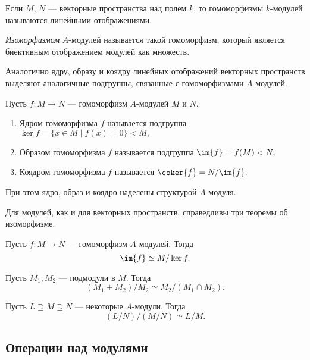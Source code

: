     Если $M$, $N$ --- векторные пространства над полем $k$, то гомоморфизмы $k$-модулей  называются линейными отображениями.

    \begin{Def}
        \textit{Изоморфизмом} $A$-модулей называется такой гомоморфизм, который является биективным отображением модулей как множеств.
    \end{Def}

    Аналогично ядру, образу и коядру линейных отображений векторных пространств выделяют аналогичные подгруппы, связанные с гомоморфизмами $A$-модулей.

    \begin{Def}
        Пусть $f : M \rightarrow N$ --- гомоморфизм $A$-модулей $M$ и $N$. 

        \begin{enumerate}
            \item Ядром гомоморфизма $f$ называется подгруппа $\ker{f} = \{x \in M \mid f(x) = 0\} < M,$
            \item Образом гомоморфизма $f$ называется подгруппа $\im{f} = f(M) < N,$
            \item Коядром гомоморфизма $f$ называется $\coker{f} = N/\im{f}.$
        \end{enumerate}
        При этом ядро, образ и коядро наделены структурой $A$-модуля.
    \end{Def}

    Для модулей, как и для векторных пространств, справедливы три теоремы об изоморфизме.

    \begin{Theorem}{\cite{A-M}}
        Пусть $f : M \rightarrow N$ --- гомоморфизм $A$-модулей. Тогда 
        $$
            \im{f} \simeq M / \ker{f}.
        $$
    \end{Theorem}
    \begin{Theorem}{\cite{A-M}}
        Пусть $M_1, M_2$ --- подмодули в $M$. Тогда
        $$
            (M_1 + M_2) / M_2 \simeq M_2 / (M_1 \cap M_2).
        $$
    \end{Theorem}
    \begin{Theorem}{\cite{A-M}}
        Пусть $L \supseteq M \supseteq N$ --- некоторые $A$-модули. Тогда
        $$
            (L/N)/(M/N) \simeq L/M.
        $$
    \end{Theorem}

    \subsection{Операции над модулями}

